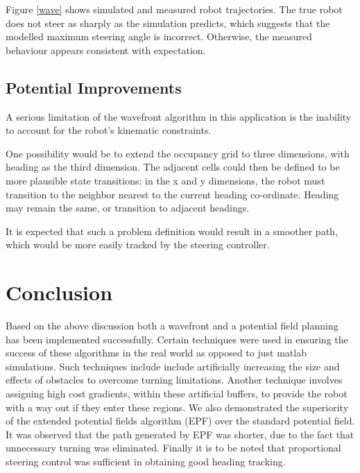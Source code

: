 \documentclass{article}
\begin{document}
Figure \ref{wave} shows simulated and measured robot trajectories. The true
robot does not steer as sharply as the simulation predicts, which suggests
that the modelled maximum steering angle is incorrect. Otherwise, the measured
behaviour appears consistent with expectation.

\subsection{Potential Improvements}

A serious limitation of the wavefront algorithm in this application is the
inability to account for the robot's kinematic constraints.

One possibility would be to extend the occupancy grid to three dimensions,
with heading as the third dimension. The adjacent cells could then be defined
to be more plausible state transitions: in the x and y dimensions, the robot
must transition to the neighbor nearest to the current heading co-ordinate.
Heading may remain the same, or transition to adjacent headings.

It is expected that such a problem definition would result in a smoother path,
which would be more easily tracked by the steering controller.

\section*{Conclusion}

Based on the above discussion both a wavefront and a potential field planning
has been implemented successfully. Certain techniques were used in ensuring
the success of these algorithms in the real world as opposed to just matlab
simulations. Such techniques include include artificially increasing the size
and effects of obstacles to overcome turning limitations. Another technique
involves assigning high cost gradients, within these artificial buffers, to
provide the robot with a way out if they enter these regions. We also
demonstrated the superiority of the extended potential fields algorithm (EPF)
over the standard potential field. It was observed that the path generated by
EPF was shorter, due to the fact that unnecessary turning was eliminated.
Finally it is to be noted that proportional steering control was sufficient in
obtaining good heading tracking.
\end{document}
